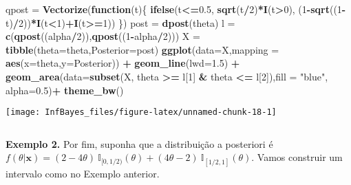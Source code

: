 \documentclass[
]{book}
\newenvironment{Shaded}{\begin{snugshade}}{\end{snugshade}}
\newcommand{\ControlFlowTok}[1]{\textcolor[rgb]{0.13,0.29,0.53}{\textbf{#1}}}
\newcommand{\DataTypeTok}[1]{\textcolor[rgb]{0.13,0.29,0.53}{#1}}
\newcommand{\DecValTok}[1]{\textcolor[rgb]{0.00,0.00,0.81}{#1}}
\newcommand{\FloatTok}[1]{\textcolor[rgb]{0.00,0.00,0.81}{#1}}
\newcommand{\KeywordTok}[1]{\textcolor[rgb]{0.13,0.29,0.53}{\textbf{#1}}}
\newcommand{\NormalTok}[1]{#1}
\newcommand{\OperatorTok}[1]{\textcolor[rgb]{0.81,0.36,0.00}{\textbf{#1}}}
\newcommand{\StringTok}[1]{\textcolor[rgb]{0.31,0.60,0.02}{#1}}
\begin{document}
\begin{Shaded}
\begin{Highlighting}[]
\NormalTok{qpost =}\StringTok{ }\KeywordTok{Vectorize}\NormalTok{(}\ControlFlowTok{function}\NormalTok{(t)\{ }\KeywordTok{ifelse}\NormalTok{(t}\OperatorTok{<=}\FloatTok{0.5}\NormalTok{, }\KeywordTok{sqrt}\NormalTok{(t}\OperatorTok{/}\DecValTok{2}\NormalTok{)}\OperatorTok{*}\KeywordTok{I}\NormalTok{(t}\OperatorTok{>}\DecValTok{0}\NormalTok{),}
\NormalTok{    (}\DecValTok{1}\OperatorTok{-}\KeywordTok{sqrt}\NormalTok{((}\DecValTok{1}\OperatorTok{-}\NormalTok{t)}\OperatorTok{/}\DecValTok{2}\NormalTok{))}\OperatorTok{*}\KeywordTok{I}\NormalTok{(t}\OperatorTok{<}\DecValTok{1}\NormalTok{)}\OperatorTok{+}\KeywordTok{I}\NormalTok{(t}\OperatorTok{>=}\DecValTok{1}\NormalTok{)) \})}
\NormalTok{post =}\StringTok{ }\KeywordTok{dpost}\NormalTok{(theta)}
\NormalTok{l =}\StringTok{ }\KeywordTok{c}\NormalTok{(}\KeywordTok{qpost}\NormalTok{((alpha}\OperatorTok{/}\DecValTok{2}\NormalTok{)),}\KeywordTok{qpost}\NormalTok{((}\DecValTok{1}\OperatorTok{-}\NormalTok{alpha}\OperatorTok{/}\DecValTok{2}\NormalTok{)))}
\NormalTok{X =}\StringTok{ }\KeywordTok{tibble}\NormalTok{(}\DataTypeTok{theta=}\NormalTok{theta,}\DataTypeTok{Posterior=}\NormalTok{post)}
\KeywordTok{ggplot}\NormalTok{(}\DataTypeTok{data=}\NormalTok{X,}\DataTypeTok{mapping =} \KeywordTok{aes}\NormalTok{(}\DataTypeTok{x=}\NormalTok{theta,}\DataTypeTok{y=}\NormalTok{Posterior)) }\OperatorTok{+}
\StringTok{  }\KeywordTok{geom_line}\NormalTok{(}\DataTypeTok{lwd=}\FloatTok{1.5}\NormalTok{) }\OperatorTok{+}
\StringTok{  }\KeywordTok{geom_area}\NormalTok{(}\DataTypeTok{data=}\KeywordTok{subset}\NormalTok{(X, theta }\OperatorTok{>=}\StringTok{ }\NormalTok{l[}\DecValTok{1}\NormalTok{] }\OperatorTok{&}\StringTok{ }\NormalTok{theta }\OperatorTok{<=}\StringTok{ }\NormalTok{l[}\DecValTok{2}\NormalTok{]),}\DataTypeTok{fill =} \StringTok{"blue"}\NormalTok{, }\DataTypeTok{alpha=}\FloatTok{0.5}\NormalTok{)}\OperatorTok{+}
\StringTok{  }\KeywordTok{theme_bw}\NormalTok{()}
\end{Highlighting}
\end{Shaded}

\begin{center}\texttt{[image: InfBayes\_files/figure-latex/unnamed-chunk-18-1]} \end{center}

\(~\)

\textbf{Exemplo 2.} Por fim, suponha que a distribuição a posteriori é \(f(\theta|\boldsymbol{x})=(2-4\theta)~\mathbb{I}_{[0,1/2)}(\theta)+(4\theta-2)~\mathbb{I}_{[1/2,1]}(\theta)\). Vamos construir um intervalo como no Exemplo anterior.
\end{document}
